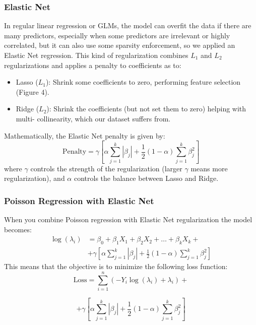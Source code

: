 \documentclass[a4paper, 11pt]{article}
\begin{document}
\begin{multicols}{2}
\subsubsection*{Elastic Net}
In regular linear regression or GLMs, the model can overfit the data if there are many predictors, especially when some predictors are irrelevant or highly correlated, but it can also use some sparsity enforcement, so we applied an Elastic Net regression. This kind of regularization combines $L_1$ and $L_2$ regularizations and applies a penalty to coefficients as to:
\begin{itemize}
    \item Lasso ($L_1$): Shrink some coefficients to
    zero, performing feature selection (Figure 4).
    \item Ridge ($L_2$): Shrink the coefficients (but
    not set them to zero) helping with multi-
    collinearity, which our dataset suffers from.
\end{itemize}
Mathematically, the Elastic Net penalty is given by:
\begin{equation}
\text{Penalty}= \gamma \left[\alpha \sum_{j=1}^k|\beta_j| + \frac{1}{2}(1-\alpha)\sum_{j=1}^k\beta_{j}^{2} \right]
\end{equation} 
where $\gamma$ controls the strength of the regularization (larger $\gamma$ means more regularization), and $\alpha$ controls the balance between Lasso and Ridge.

\subsubsection*{Poisson Regression with Elastic Net}
When you combine Poisson regression with Elastic Net regularization the model becomes:
\begin{equation}
\begin{split}
\log(\lambda_i)&=\beta_0+\beta_1X_1+\beta_2X_2+\dots+\beta_kX_k+ \\
&+\gamma \left[\alpha \sum_{j=1}^k|\beta_j| + \frac{1}{2}(1-\alpha)\sum_{j=1}^k\beta_{j}^{2} \right]
\end{split}
\end{equation}
This means that the objective is to minimize the following loss function:
\begin{equation*}
\text{Loss} = \sum_{i=1}^n \left( -Y_i \log(\lambda_i) + \lambda_i \right) +
\end{equation*}

\begin{equation*}
+ \gamma \left[ \alpha \sum_{j=1}^k |\beta_j| + \frac{1}{2}(1-\alpha) \sum_{j=1}^k \beta_{j}^{2} \right]
\end{equation*}



\end{multicols}
\end{document}
